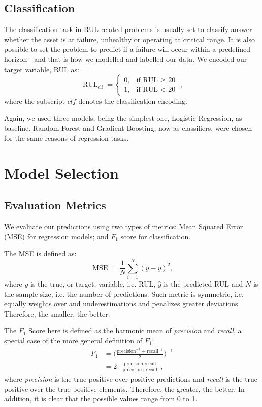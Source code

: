 \documentclass[letterpaper, 10 pt, conference, onecolumn]{ieeeconf}  %
\begin{document}
\subsection{Classification}
The classification task in RUL-related problems is usually set to classify answer whether the asset is at failure, unhealthy or operating at critical range. It is also possible to set the problem to predict if a failure will occur within a predefined horizon - and that is how we modelled and labelled our data. We encoded our target variable, RUL as:
\begin{equation}
	\operatorname{RUL}_\text{clf} = \begin{cases} 
		0, & \text{if RUL $\geq$ 20} \\
		1, & \text{if RUL $<$ 20}
		\end{cases} \; ,
\end{equation}
where the subscript $clf$ denotes the classification encoding.

Again, we used three models, being the simplest one, Logistic Regression, as baseline. Random Forest and Gradient Boosting, now as classifiers, were chosen for the same reasons of regression tasks.


\section{Model Selection}\label{sec:model-selection}
\subsection{Evaluation Metrics}
We evaluate our predictions using two types of metrics: Mean Squared Error (MSE) for regression models; and $F_1$ score for classification.

The MSE is defined as:
\begin{equation}\label{eq:mse}
    \operatorname{MSE} = \frac{1}{N} \sum_{i=1}^{N} (y - \hat{y})^2,
\end{equation}
where $y$ is the true, or target, variable, i.e. RUL, $\hat{y}$ is the predicted RUL and $N$ is the sample size, i.e. the number of predictions. Such metric is symmetric, i.e. equally weights over and underestimations and penalizes greater deviations. Therefore, the smaller, the better.

The $F_1$ Score here is defined as the harmonic mean of \textit{precision} and \textit{recall}, a special case of the more general definition of $F_1$:
\begin{align}\label{eq:f1}
    F_1 &= \bigg( \frac{\text{precision}^{-1} + \text{recall}^{-1}}{2} \bigg) ^{-1} \nonumber\\
    &= 2 \cdot \frac{\text{precision} \cdot \text{recall}}{\text{precision} + \text{recall}} \; ,
\end{align}
where \textit{precision} is the true positive over positive predictions and \textit{recall} is the true positive over the true positive elements. Therefore, the greater, the better. In addition, it is clear that the possible values range from 0 to 1.
\end{document}
